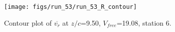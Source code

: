\begin{figure}[H]
\centering
\texttt{[image: figs/run\_53/run\_53\_R\_contour]}
\caption{Contour plot of $\overline{v_{r}}$ at $z/c$=9.50, $V_{free}$=19.08, station 6.}
\label{fig:run_53_R_contour}
\end{figure}



